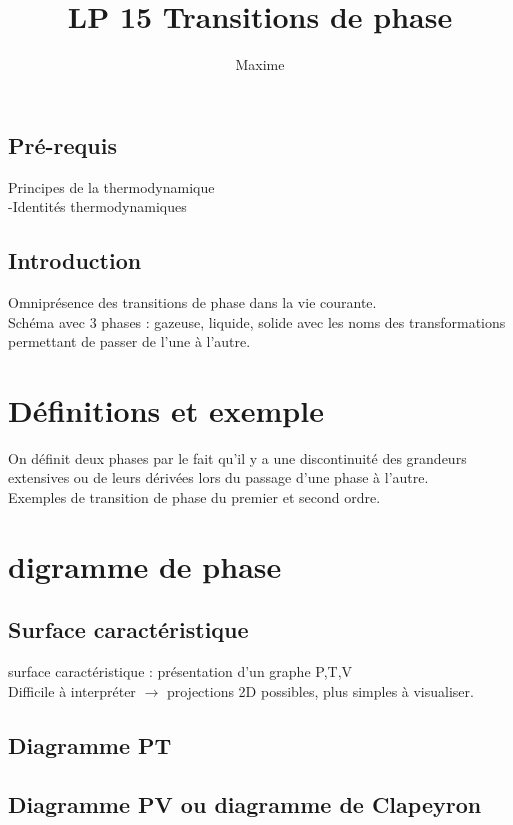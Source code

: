\documentclass[12pt,prb,aps,epsf]{report}
\begin{document}
	
	\title{LP 15 Transitions de phase}
\author{Maxime}

\maketitle

\tableofcontents

\pagebreak


\subsection{Pré-requis}
Principes de la thermodynamique\\
-Identités thermodynamiques

\subsection{Introduction}
Omniprésence des transitions de phase dans la vie courante.\\
Schéma avec 3 phases : gazeuse, liquide, solide avec les noms des transformations permettant de passer de l'une à l'autre.

\section{Définitions et exemple}
On définit deux phases par le fait qu'il y a une discontinuité des grandeurs extensives ou de leurs dérivées lors du passage d'une phase à l'autre.\\
Exemples de transition de phase du premier et second ordre.
\section{digramme de phase}
\subsection{Surface caractéristique}
surface caractéristique : présentation d'un graphe P,T,V\\
Difficile à interpréter $\rightarrow$ projections 2D possibles, plus simples à visualiser.

\subsection{Diagramme PT}
\subsection{Diagramme PV ou diagramme de Clapeyron}
\end{document}
